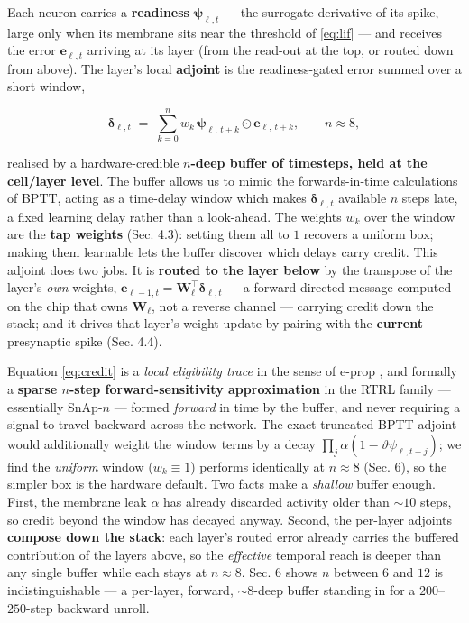 \documentclass[11pt]{article}
\begin{document}
Each neuron carries a \textbf{readiness} \(\bm\psi_{\ell,t}\) --- the
surrogate derivative of its spike, large only when its membrane sits
near the threshold of \eqref{eq:lif} --- and receives the error
\(\bm e_{\ell,t}\) arriving at its layer (from the read-out at the top,
or routed down from above). The layer's local \textbf{adjoint} is the
readiness-gated error summed over a short window,

\begin{equation}
\bm\delta_{\ell,t} \;=\; \sum_{k=0}^{n} w_k\,\bm\psi_{\ell,\,t+k} \odot \bm e_{\ell,\,t+k}, \qquad n \approx 8,
\label{eq:credit}
\end{equation}

realised by a hardware-credible \textbf{\(n\)-deep buffer of timesteps,
held at the cell/layer level}. The buffer allows us to mimic the
forwards-in-time calculations of BPTT, acting as a time-delay window
which makes \(\bm\delta_{\ell,t}\) available \(n\) steps late, a fixed
learning delay rather than a look-ahead. The weights \(w_k\) over the
window are the \textbf{tap weights} (Sec. 4.3): setting them all to
\(1\) recovers a uniform box; making them learnable lets the buffer
discover which delays carry credit. This adjoint does two jobs. It is
\textbf{routed to the layer below} by the transpose of the layer's
\emph{own} weights,
\(\bm e_{\ell-1,t} = \bm W_\ell^{\!\top}\bm\delta_{\ell,t}\) --- a
forward-directed message computed on the chip that owns \(\bm W_\ell\),
not a reverse channel --- carrying credit down the stack; and it drives
that layer's weight update by pairing with the \textbf{current}
presynaptic spike (Sec. 4.4).

Equation \eqref{eq:credit} is a \emph{local eligibility trace} in the
sense of e-prop \cite{bellec2020eprop}, and formally a \textbf{sparse
\(n\)-step forward-sensitivity approximation} in the RTRL family ---
essentially SnAp-\(n\) \cite{menick2021snap} --- formed \emph{forward}
in time by the buffer, and never requiring a signal to travel backward
across the network. The exact truncated-BPTT adjoint would additionally
weight the window terms by a decay
\(\prod_{j}\alpha(1-\vartheta\psi_{\ell,t+j})\); we find the
\emph{uniform} window (\(w_k\equiv1\)) performs identically at
\(n\approx8\) (Sec. 6), so the simpler box is the hardware default. Two
facts make a \emph{shallow} buffer enough. First, the membrane leak
\(\alpha\) has already discarded activity older than \({\sim}10\) steps,
so credit beyond the window has decayed anyway. Second, the per-layer
adjoints \textbf{compose down the stack}: each layer's routed error
already carries the buffered contribution of the layers above, so the
\emph{effective} temporal reach is deeper than any single buffer while
each stays at \(n\approx8\). Sec. 6 shows \(n\) between \(6\) and \(12\)
is indistinguishable --- a per-layer, forward, \({\sim}8\)-deep buffer
standing in for a \(200\)--\(250\)-step backward unroll.
\end{document}
